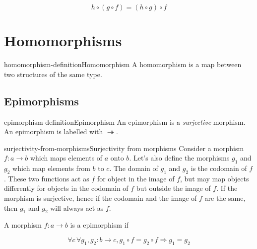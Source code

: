 \documentclass[preview]{standalone}
\begin{document}
\[
    h \circ (g \circ f) = (h \circ g) \circ f
\]

\pagebreak

\section{Homomorphisms}

\begin{snippetdefinition}{homomorphism-definition}{Homomorphism}
    A homomorphism is a map between two structures of the same type.
\end{snippetdefinition}

\subsection{Epimorphisms}

\begin{snippetdefinition}{epimorphism-definition}{Epimorphism}
    An epimorphism is a \textit{surjective} morphism.
    An epimorphism is labelled with \(\twoheadrightarrow\).
\end{snippetdefinition}

\begin{snippetdefinition}{surjectivity-from-morphisms}{Surjectivity from morphisms}
    Consider a morphism \(f: a \rightarrow b\) which maps elements of \(a\) onto \(b\).
    Let's also define the morphisms \(g_1\) and \(g_2\) which map elements from \(b\) to \(c\).
    The domain of \(g_1\) and \(g_2\) is the codomain of \(f\). These two functions act
    as \(f\) for object in the image of \(f\), but may map objects differently
    for objects in the codomain of \(f\) but outside the image of \(f\).
    If the morphism is surjective, hence if the codomain and the image of \(f\) are the same,
    then \(g_1\) and \(g_2\) will always act as \(f\).

    A morphism \(f: a \rightarrow b\) is a epimorphism if

    \[
        \forall c\, \forall g_1, g_2 : b \rightarrow c, g_1 \circ f = g_2 \circ f \Rightarrow g_1 = g_2
    \]

    \begin{center}
    \end{center}
\end{snippetdefinition}
\end{document}
